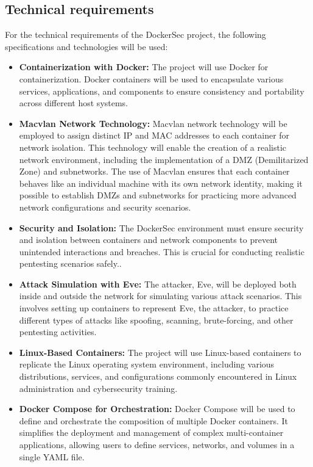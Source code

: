 \documentclass[a4paper,11pt,singlespacing]{article}
\begin{document}
\subsection{Technical requirements}
For the technical requirements of the DockerSec project, the following specifications and technologies will be used:
\begin{itemize}
    \item \textbf{Containerization with Docker:} The project will use Docker for containerization. Docker containers will be used to encapsulate various services, applications, and components to ensure consistency and portability across different host systems.

    \item \textbf{Macvlan Network Technology:}  Macvlan network technology will be employed to assign distinct IP and MAC addresses to each container for network isolation. This technology will enable the creation of a realistic network environment, including the implementation of a DMZ (Demilitarized Zone) and subnetworks. The use of Macvlan ensures that each container behaves like an individual machine with its own network identity, making it possible to establish DMZs and subnetworks for practicing more advanced network configurations and security scenarios.
    
    \item \textbf{Security and Isolation:} The DockerSec environment must ensure security and isolation between containers and network components to prevent unintended interactions and breaches. This is crucial for conducting realistic pentesting scenarios safely..
   
    \item \textbf{Attack Simulation with Eve:} The attacker, Eve, will be deployed both inside and outside the network for simulating various attack scenarios. This involves setting up containers to represent Eve, the attacker, to practice different types of attacks like spoofing, scanning, brute-forcing, and other pentesting activities.

    \item \textbf{Linux-Based Containers:} The project will use Linux-based containers to replicate the Linux operating system environment, including various distributions, services, and configurations commonly encountered in Linux administration and cybersecurity training.

    \item \textbf{Docker Compose for Orchestration:} Docker Compose will be used to define and orchestrate the composition of multiple Docker containers. It simplifies the deployment and management of complex multi-container applications, allowing users to define services, networks, and volumes in a single YAML file.


\end{itemize}
\end{document}
